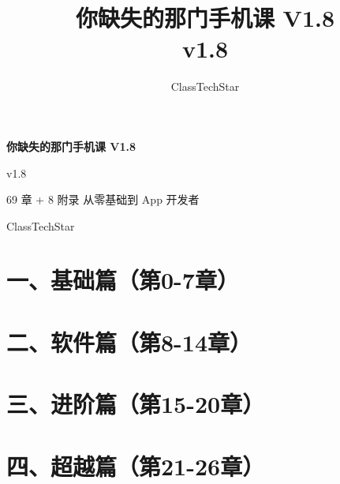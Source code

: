 \documentclass[11pt,a4paper,openany]{book}
\title{你缺失的那门手机课 V1.8\\ \large v1.8}
\author{ClassTechStar}
\date{}
\begin{document}
\begin{titlepage}
\centering
\vspace*{0.28\textheight}
{\Huge\bfseries 你缺失的那门手机课 V1.8\par}
\vspace{1.2em}
{\Large v1.8\par}
\vspace{3em}
{\large 69 章 + 8 附录 \quad 从零基础到 App 开发者\par}
\vfill
{\large ClassTechStar\par}
\end{titlepage}
\frontmatter
\tableofcontents
\mainmatter
\part*{一、基础篇（第0-7章）}










\part*{二、软件篇（第8-14章）}








\part*{三、进阶篇（第15-20章）}







\part*{四、超越篇（第21-26章）}







\end{document}
